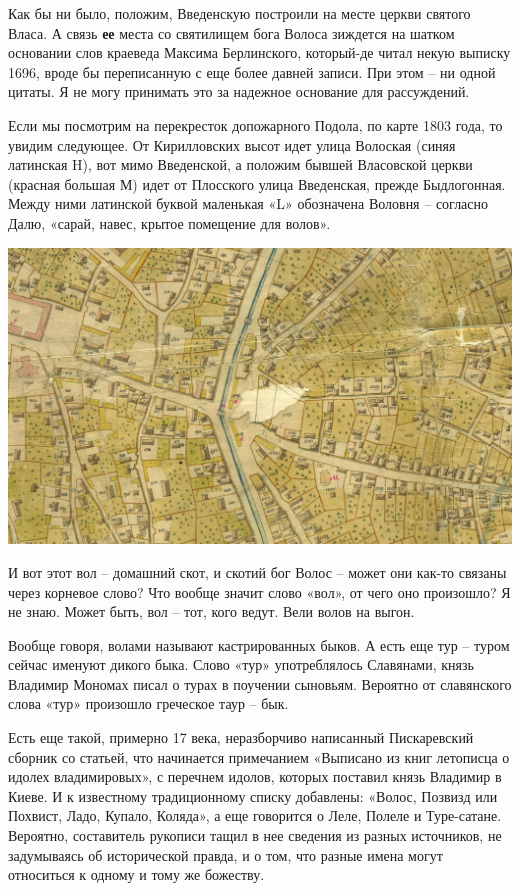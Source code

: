 Как бы ни было, положим, Введенскую построили на месте церкви святого Власа. А связь \textbf{ее} места со святилищем бога Волоса зиждется на шатком основании слов краеведа Максима Берлинского, который-де читал некую выписку 1696, вроде бы переписанную с еще более давней записи. При этом – ни одной цитаты. Я не могу принимать это за надежное основание для рассуждений.

Если мы посмотрим на перекресток допожарного Подола, по карте 1803 года, то увидим следующее. От Кирилловских высот идет улица Волоская (синяя латинская H), вот мимо Введенской, а положим бывшей Власовской церкви (красная большая М) идет от Плосского улица Введенская, прежде Быдлогонная. Между ними латинской буквой маленькая «L» обозначена Воловня – согласно Далю, «сарай, навес, крытое помещение для волов».

\begin{center}
\includegraphics[width=\linewidth]{chast-colebanie-osnov/tur/volos-map-01.jpg}
\end{center}

   И вот этот вол – домашний скот, и скотий бог Волос – может они как-то связаны через корневое слово? Что вообще значит слово «вол», от чего оно произошло? Я не знаю. Может быть, вол – тот, кого ведут. Вели волов на выгон.

   Вообще говоря, волами называют кастрированных быков. А есть еще тур – туром сейчас именуют дикого быка. Слово «тур» употреблялось Славянами, князь Владимир Мономах писал о турах в поучении сыновьям. Вероятно от славянского слова «тур» произошло греческое таур – бык.

Есть еще такой, примерно 17 века, неразборчиво написанный Пискаревский сборник со статьей, что начинается примечанием «Выписано из книг летописца о идолех владимировых», с перечнем идолов, которых поставил князь Владимир в Киеве. И к известному традиционному списку добавлены: «Волос, Позвизд или Похвист, Ладо, Купало, Коляда», а еще говорится о Леле, Полеле и Туре-сатане. Вероятно, составитель рукописи тащил в нее сведения из разных источников, не задумываясь об исторической правда, и о том, что разные имена могут относиться к одному и тому же божеству. 

